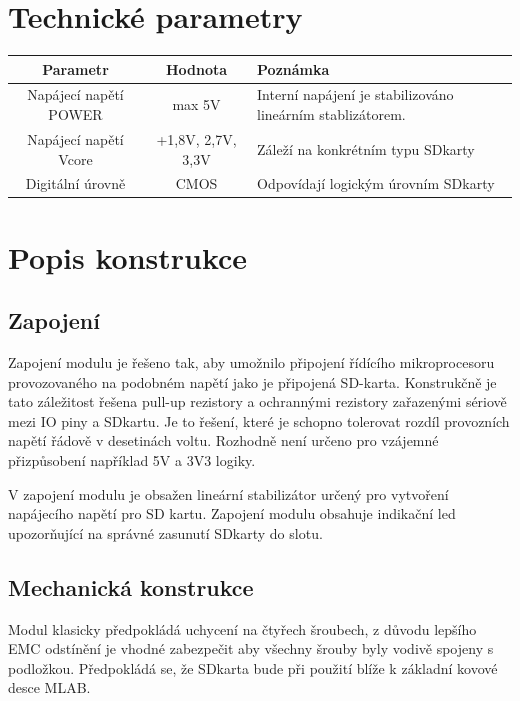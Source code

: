\documentclass[12pt,a4paper,oneside]{article}
\begin{document}
\section{Technické parametry}
\begin{table}[htbp]
\begin{center}
\begin{tabular}{|c|c|p{4.7cm}|}
\hline
Parametr & Hodnota & Poznámka \\
\hline
Napájecí napětí POWER  & max 5V &  Interní napájení je stabilizováno lineárním stablizátorem.\\ 
\hline
Napájecí napětí Vcore & +1,8V, 2,7V, 3,3V &  Záleží na konkrétním typu SDkarty \\ 
\hline
Digitální úrovně & CMOS &  Odpovídají logickým úrovním SDkarty \\ 
\hline
\end{tabular}
\end{center}
\end{table}

\section{Popis konstrukce}

\subsection{Zapojení}
Zapojení modulu je řešeno tak, aby umožnilo připojení řídícího mikroprocesoru provozovaného na podobném napětí jako je připojená SD-karta. Konstrukčně je tato záležitost řešena pull-up rezistory a ochrannými rezistory zařazenými sériově mezi IO piny a SDkartu. Je to řešení, které je schopno tolerovat rozdíl provozních napětí řádově v desetinách voltu. Rozhodně není určeno pro vzájemné přizpůsobení například 5V a 3V3 logiky.



V zapojení modulu je obsažen lineární stabilizátor určený pro vytvoření napájecího napětí pro SD kartu. Zapojení modulu obsahuje indikační led upozorňující na správné zasunutí SDkarty do slotu. 

\subsection{Mechanická konstrukce}

Modul klasicky předpokládá uchycení na čtyřech šroubech, z důvodu lepšího EMC odstínění je vhodné zabezpečit aby všechny šrouby byly vodivě spojeny s podložkou.  Předpokládá se, že SDkarta bude při použití blíže k základní kovové desce MLAB. 
\end{document}
